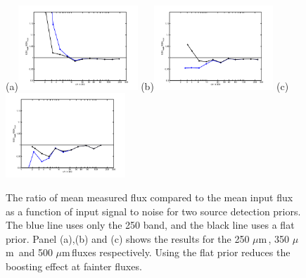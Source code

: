 \documentclass[useAMS,usenatbib]{mn2e}
\def\mic{ $\mu $m\,}
\begin{document}
\begin{figure}
(a)\includegraphics[width=0.4\textwidth,valign=t]{flux_bias250.pdf}
(b)\includegraphics[width=0.4\textwidth,valign=t]{flux_bias350.pdf}
(c)\includegraphics[width=0.4\textwidth,valign=t]{flux_bias500.pdf}
\caption{\label{fig:fluxes} 
The ratio of mean measured flux compared to the mean input flux as a
function of input signal to noise for two source detection priors. The
blue line uses only the 250 band, and the black line uses a flat
prior. Panel (a),(b) and (c) shows the results for the 250\mic, 350\mic
and 500\mic fluxes respectively. Using the
flat prior reduces the boosting effect at fainter fluxes. 
}

\end{figure}

\end{document}
